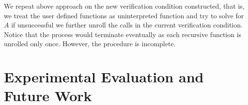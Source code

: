 \documentclass[a4paper,10pt]{article}
\begin{document}
We repeat above approach on the new verification condition constructed, that is, we treat  the user defined functions as uninterpreted function and try to solve for $A$ if unsuccessful we further unroll the calls in the current verification condition. Notice that the process would terminate eventually as each recursive function is unrolled only once. 
However, the procedure is incomplete. 

\section{Experimental Evaluation and Future Work}




\end{document}
